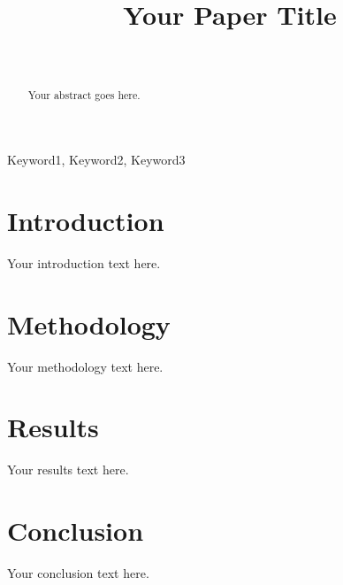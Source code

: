 \documentclass[conference]{IEEEtran}
\title{Your Paper Title}
\author{%
    \IEEEauthorblockN{Your Name} \\
    \IEEEauthorblockA{Your Institution \\ Email}
}
\begin{document}
\maketitle

\begin{abstract}
Your abstract goes here.
\end{abstract}

\begin{IEEEkeywords}
Keyword1, Keyword2, Keyword3
\end{IEEEkeywords}

\section{Introduction}
Your introduction text here.

\section{Methodology}
Your methodology text here.

\section{Results}
Your results text here.

\section{Conclusion}
Your conclusion text here.



\end{document}

